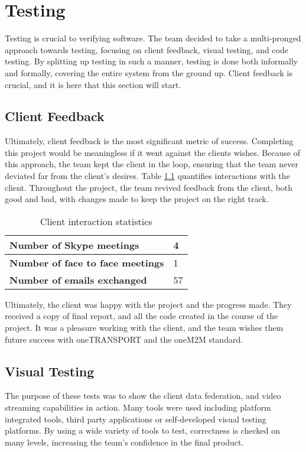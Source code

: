 \chapter{Testing}

Testing is crucial to verifying software. The team decided to take a multi-pronged approach towards testing, focusing on client feedback, visual testing, and code testing. By splitting up testing in such a manner, testing is done both informally and formally, covering the entire system from the ground up. Client feedback is crucial, and it is here that this section will start.

\section{Client Feedback}

Ultimately, client feedback is the most significant metric of success. Completing this project would be meaningless if it went against the clients wishes. Because of this approach, the team kept the client in the loop, ensuring that the team never deviated far from the client's desires. Table \ref{stats} quantifies interactions with the client. Throughout the project, the team revived feedback from the client, both good and bad, with changes made to keep the project on the right track.

\begin{table}[H]
\centering
\begin{tabular}{|l|l|}
\hline
\textbf{Number of Skype meetings}        & 4  \\ \hline
\textbf{Number of face to face meetings} & 1  \\ \hline
\textbf{Number of emails exchanged}      & 57 \\ \hline
\end{tabular}
\caption{Client interaction statistics}
\label{stats}
\end{table}

Ultimately, the client was happy with the project and the progress made. They received a copy of final report, and all the code created in the course of the project. It was a pleasure working with the client, and the team wishes them future success with oneTRANSPORT and the oneM2M standard.

\section{Visual Testing}

The purpose of these tests was to show the client data federation, and video streaming capabilities in action. Many tools were used including platform integrated tools, third party applications or self-developed visual testing platforms. By using a wide variety of tools to test, correctness is checked on many levels, increasing the team's confidence in the final product.

